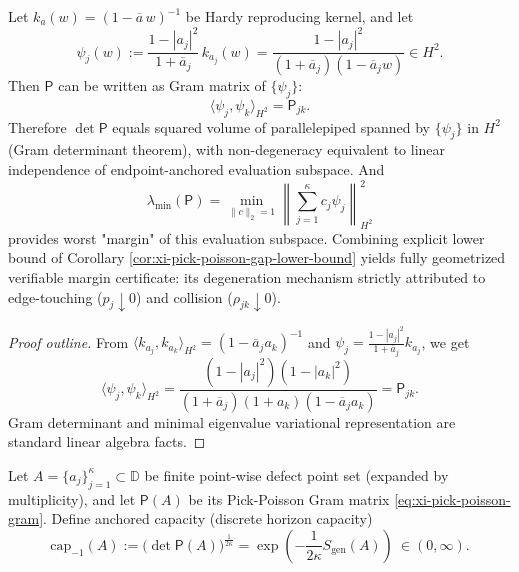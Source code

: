 \begin{proposition}\label{prop:xi-pick-poisson-interpolation-margin-certificate}
Let \(k_a(w)=(1-\overline a\,w)^{-1}\) be Hardy reproducing kernel, and let
\[
\psi_j(w):=\frac{1-|a_j|^2}{1+\overline a_j}\,k_{a_j}(w)
=\frac{1-|a_j|^2}{(1+\overline a_j)(1-\overline a_j w)}\in H^2.
\]
Then \(\mathsf P\) can be written as Gram matrix of \(\{\psi_j\}\):
\[
\boxed{\;
\langle \psi_j,\psi_k\rangle_{H^2}=\mathsf P_{jk}.\;}
\]
Therefore \(\det\mathsf P\) equals squared volume of parallelepiped spanned by \(\{\psi_j\}\) in \(H^2\) (Gram determinant theorem), with non-degeneracy equivalent to linear independence of endpoint-anchored evaluation subspace.
And
\[
\lambda_{\min}(\mathsf P)
=\min_{\|c\|_2=1}\left\|\sum_{j=1}^{\kappa}c_j\psi_j\right\|_{H^2}^2
\]
provides worst "margin" of this evaluation subspace.
Combining explicit lower bound of Corollary \ref{cor:xi-pick-poisson-gap-lower-bound} yields fully geometrized verifiable margin certificate: its degeneration mechanism strictly attributed to edge-touching (\(p_j\downarrow 0\)) and collision (\(\rho_{jk}\downarrow 0\)).
\end{proposition}
\begin{proof}[Proof outline]
From \(\langle k_{a_j},k_{a_k}\rangle_{H^2}=(1-\overline a_j a_k)^{-1}\) and
\(
\psi_j=\frac{1-|a_j|^2}{1+\overline a_j}k_{a_j}
\),
we get
\[
\langle \psi_j,\psi_k\rangle_{H^2}
=\frac{(1-|a_j|^2)(1-|a_k|^2)}{(1+\overline a_j)(1+a_k)(1-\overline a_j a_k)}
=\mathsf P_{jk}.
\]
Gram determinant and minimal eigenvalue variational representation are standard linear algebra facts.
\end{proof}

\begin{definition}\label{def:xi-anchored-capacity-capminus1}
Let \(A=\{a_j\}_{j=1}^{\kappa}\subset\mathbb{D}\) be finite point-wise defect point set (expanded by multiplicity), and let \(\mathsf P(A)\) be its Pick-Poisson Gram matrix \eqref{eq:xi-pick-poisson-gram}.
Define anchored capacity (discrete horizon capacity)
\[
\boxed{\;
\mathrm{cap}_{-1}(A):=\bigl(\det\mathsf P(A)\bigr)^{\frac{1}{2\kappa}}
=\exp\!\left(-\frac{1}{2\kappa}S_{\mathrm{gen}}(A)\right)\ \in(0,\infty).\;}
\]
\end{definition}

